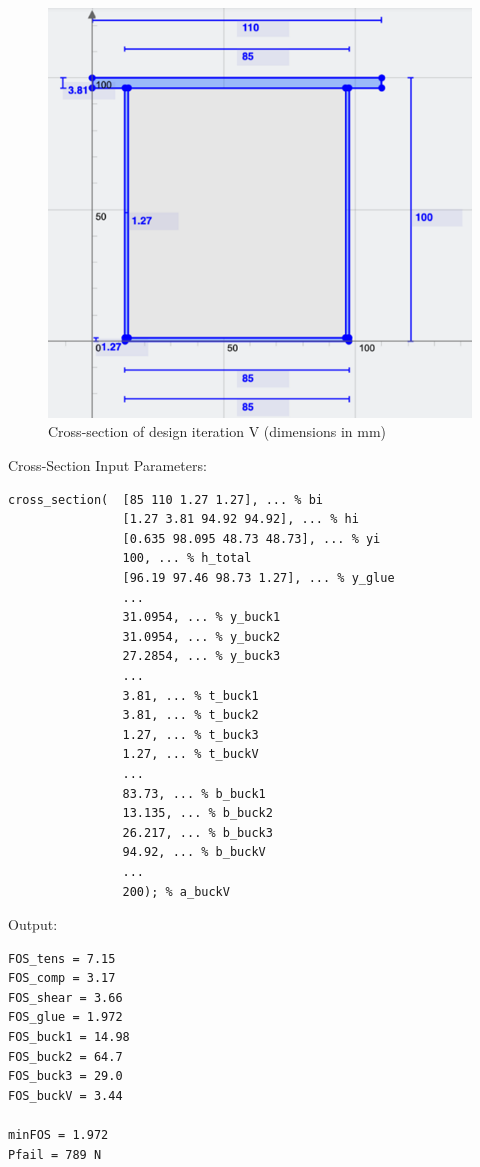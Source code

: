 \documentclass[11pt]{article}
\newcommand{\imagewidth}{.5\linewidth}
\begin{document}
\begin{figure}[h]
    \centering
    \includegraphics[width=\imagewidth]{img/design-5-cs.png}
    \caption{Cross-section of design iteration V (dimensions in mm)}
    \label{d5}
\end{figure}

Cross-Section Input Parameters:
\begin{lstlisting}[]
cross_section(  [85 110 1.27 1.27], ... % bi
                [1.27 3.81 94.92 94.92], ... % hi
                [0.635 98.095 48.73 48.73], ... % yi
                100, ... % h_total
                [96.19 97.46 98.73 1.27], ... % y_glue
                ...
                31.0954, ... % y_buck1
                31.0954, ... % y_buck2
                27.2854, ... % y_buck3
                ...
                3.81, ... % t_buck1
                3.81, ... % t_buck2
                1.27, ... % t_buck3
                1.27, ... % t_buckV
                ...
                83.73, ... % b_buck1
                13.135, ... % b_buck2
                26.217, ... % b_buck3
                94.92, ... % b_buckV
                ...
                200); % a_buckV
\end{lstlisting}

Output:
\begin{lstlisting}[]
FOS_tens = 7.15
FOS_comp = 3.17
FOS_shear = 3.66
FOS_glue = 1.972
FOS_buck1 = 14.98
FOS_buck2 = 64.7
FOS_buck3 = 29.0
FOS_buckV = 3.44

minFOS = 1.972
Pfail = 789 N    
\end{lstlisting}
\end{document}
